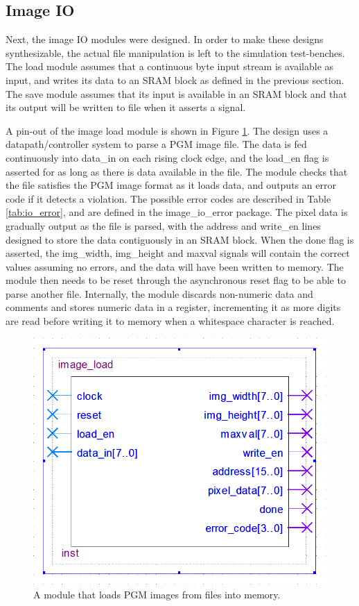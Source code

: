 \documentclass[a4paper, 10pt, titlepage]{article}
\begin{document}
\subsection{Image IO}

Next, the image IO modules were designed. In order to make these designs synthesizable, the actual file manipulation is left to the simulation test-benches. The load module assumes that a continuous byte input stream is available as input, and writes its data to an SRAM block as defined in the previous section. The save module assumes that its input is available in an SRAM block and that its output will be written to file when it asserts a signal.

A pin-out of the image load module is shown in Figure \ref{fig:image_load}. The design uses a datapath/controller system to parse a PGM image file. The data is fed continuously into data\_in on each rising clock edge, and the load\_en flag is asserted for as long as there is data available in the file. The module checks that the file satisfies the PGM image format as it loads data, and outputs an error code if it detects a violation. The possible error codes are described in Table \ref{tab:io_error}, and are defined in the image\_io\_error package. The pixel data is gradually output as the file is parsed, with the address and write\_en lines designed to store the data contiguously in an SRAM block. When the done flag is asserted, the img\_width, img\_height and maxval signals will contain the correct values assuming no errors, and the data will have been written to memory. The module then needs to be reset through the asynchronous reset flag to be able to parse another file. Internally, the module discards non-numeric data and comments and stores numeric data in a register, incrementing it as more digits are read before writing it to memory when a whitespace character is reached.

\begin{figure}[htb]
    \centering
    \includegraphics[width=0.5\linewidth]{image_load_entity.PNG}
    \caption{A module that loads PGM images from files into memory.}
    \label{fig:image_load}
\end{figure}
\end{document}
